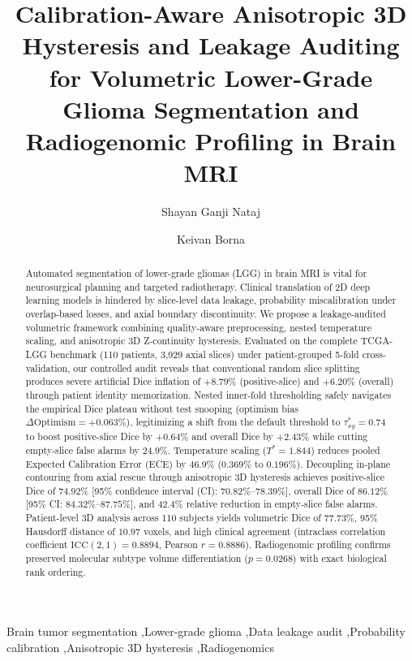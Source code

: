 \documentclass[preprint,3p,times,onecolumn]{elsarticle}
\begin{document}
\begin{frontmatter}

\title{Calibration-Aware Anisotropic 3D Hysteresis and Leakage Auditing for Volumetric Lower-Grade Glioma Segmentation and Radiogenomic Profiling in Brain MRI}

\author[aff1]{Shayan Ganji Nataj}

\author[aff1]{Keivan Borna}

\address[aff1]{Department of Computer Science, Faculty of Mathematics and Computer Science, Kharazmi University, Tehran, Iran}

\begin{abstract}
Automated segmentation of lower-grade gliomas (LGG) in brain MRI is vital for neurosurgical planning and targeted radiotherapy. Clinical translation of 2D deep learning models is hindered by slice-level data leakage, probability miscalibration under overlap-based losses, and axial boundary discontinuity. We propose a leakage-audited volumetric framework combining quality-aware preprocessing, nested temperature scaling, and anisotropic 3D Z-continuity hysteresis. Evaluated on the complete TCGA-LGG benchmark (110 patients, 3,929 axial slices) under patient-grouped 5-fold cross-validation, our controlled audit reveals that conventional random slice splitting produces severe artificial Dice inflation of $+8.79\%$ (positive-slice) and $+6.20\%$ (overall) through patient identity memorization. Nested inner-fold thresholding safely navigates the empirical Dice plateau without test snooping (optimism bias $\Delta\mathrm{Optimism} = +0.063\%$), legitimizing a shift from the default threshold to $\tau_{xy}^* = 0.74$ to boost positive-slice Dice by $+0.64\%$ and overall Dice by $+2.43\%$ while cutting empty-slice false alarms by $24.9\%$. Temperature scaling ($T^* = 1.844$) reduces pooled Expected Calibration Error (ECE) by $46.9\%$ ($0.369\%$ to $0.196\%$). Decoupling in-plane contouring from axial rescue through anisotropic 3D hysteresis achieves positive-slice Dice of $74.92\%$ [95\% confidence interval (CI): $70.82\%$--$78.39\%$], overall Dice of $86.12\%$ [95\% CI: $84.32\%$--$87.75\%$], and $42.4\%$ relative reduction in empty-slice false alarms. Patient-level 3D analysis across 110 subjects yields volumetric Dice of $77.73\%$, 95\% Hausdorff distance of $10.97$ voxels, and high clinical agreement (intraclass correlation coefficient $\text{ICC}(2, 1) = 0.8894$, Pearson $r = 0.8886$). Radiogenomic profiling confirms preserved molecular subtype volume differentiation ($p = 0.0268$) with exact biological rank ordering.
\end{abstract}

\begin{keyword}
Brain tumor segmentation \sep Lower-grade glioma \sep Data leakage audit \sep Probability calibration \sep Anisotropic 3D hysteresis \sep Radiogenomics
\end{keyword}

\end{frontmatter}
\end{document}

